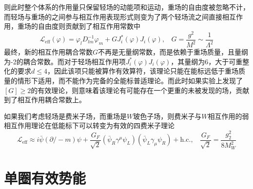 则此时整个体系的作用量只保留轻场的动能项和运动，重场的自由度被忽略不计，而轻场与重场的之间参与相互作用表现形式则变为了两个轻场流之间直接相互作用，重场的自由度则贡献到了相互作用常数中
\begin{equation}
    \mathscr{L}_\mathrm{eff} (\varphi) = \varphi_l D^{-1}_{lm}\varphi_m +  GJ^*_i(\varphi)  J_i(\varphi),~~~~G = \frac{g^2}{M^2}\sim\frac{1}{\Lambda^2}
\end{equation}
最终，新的相互作用耦合常数$G$不再是无量纲常数，而是依赖于重场质量，且量纲为-2的耦合常数。而对于轻场相互作用项$J^*_i(\varphi)  J_i(\varphi)$，其量纲为6，大于可重整化的要求$d\leq4$，因此该项只能被算作有效算符，该理论只能在能标远低于重场质量的情形下适用，而不能作为完备的全能标普适理论。而此时如果实验上发现了$[G]\geq 2$的有效理论，则意味着该理论有可能存在一个更重的未被发现的场，贡献到了相互作用耦合常数上。

如果我们考虑轻场是费米子场，而重场是$W$玻色子场，则费米子与$W$相互作用的弱相互作用理论在低能标下可以转变为有效的四费米子理论
\begin{equation}
    \mathscr{L}_\mathrm{eff} \approx i\bar{\psi}(\partial\!\!\!/-m)\psi + \frac{G_F}{\sqrt{2}}(\bar{\psi}_R\gamma^\mu\psi_L)(\bar{\psi}_L\gamma_\mu\psi_R) + \mathrm{h.c.},~~~~\frac{G_F}{\sqrt{2}} = \frac{g_2^2}{8M_W^2}
\end{equation}

\section{单圈有效势能}

